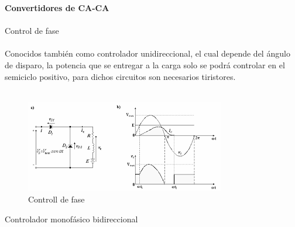 \documentclass[12pt]{report}
\begin{document}
\newpage
 {\huge \textbf{Convertidores de CA-CA}\\}\\
{\Large Control de fase}\\\\
Conocidos también como controlador unidireccional, el cual depende del ángulo de disparo, la potencia que se entregar a la carga solo se podrá controlar en el semiciclo positivo, para dichos circuitos son necesarios tiristores.\\\\
\begin{figure}[hbtp]
\caption{Controll de fase}
\centering
\includegraphics[scale=1]{images (1).png}
\end{figure}

{\Large Controlador monofásico bidireccional }\\
\end{document}
